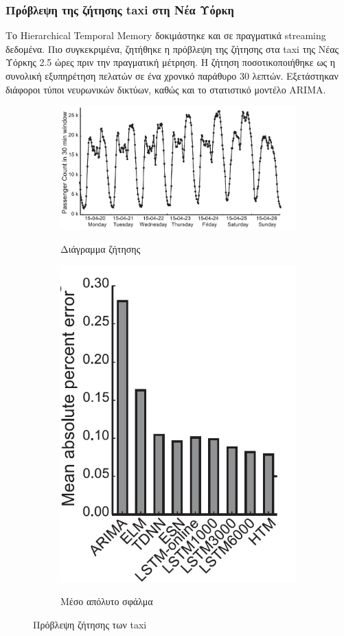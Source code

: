 \subsubsection{Πρόβλεψη της ζήτησης taxi στη Νέα Υόρκη}

Το Hierarchical Temporal Memory δοκιμάστηκε και σε πραγματικά streaming δεδομένα.
Πιο συγκεκριμένα, ζητήθηκε η πρόβλεψη της ζήτησης στα taxi της Νέας Υόρκης 2.5 ώρες πριν την πραγματική μέτρηση.
Η ζήτηση ποσοτικοποιήθηκε ως η συνολική εξυπηρέτηση πελατών σε ένα χρονικό παράθυρο 30 λεπτών.
Εξετάστηκαν διάφοροι τύποι νευρωνικών δικτύων, καθώς και το στατιστικό μοντέλο ARIMA.

\begin{figure} [H]
	\centering%
	\begin{subfigure}{0.5\columnwidth}
		{\includegraphics[width=\columnwidth,clip=true]{figures/vlsi/taxi_demand.jpg}}
		\caption{Διάγραμμα ζήτησης}
		\label{fig:taxi_demand}
	\end{subfigure}%
	\begin{subfigure}{0.5\columnwidth}
		\centering
		{\includegraphics[width=0.5\columnwidth,clip=true]{figures/vlsi/taxi_accuracy.jpg}}
		\caption{Μέσο απόλυτο σφάλμα}
		\label{fig:taxi_accuracy}
	\end{subfigure}
	\caption{Πρόβλεψη ζήτησης των taxi}
	\label{fig:taxi_simulation}
\end{figure}

